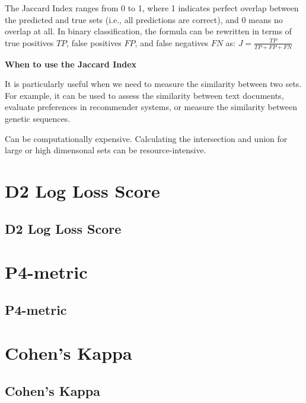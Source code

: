 The Jaccard Index ranges from 0 to 1, where 1 indicates perfect overlap between the predicted and true sets (i.e., all predictions are correct),
and 0 means no overlap at all. In binary classification, the formula can be rewritten in terms of true positives $TP$, false positives $FP$, and false negatives
$FN$ as: $J = \frac{TP}{TP + FP + FN}$

\textbf{When to use the Jaccard Index}

It is particularly useful when we need to measure the similarity between two sets. For example, it can be used to assess the similarity between text documents,
evaluate preferences in recommender systems, or measure the similarity between genetic sequences.

{
    \item Can be computationally expensive. Calculating the intersection and union for large or high dimensonal sets can be resource-intensive.
}


\clearpage
\thispagestyle{classificationstyle}
\section{D2 Log Loss Score}
\subsection{D2 Log Loss Score}

\clearpage
\thispagestyle{classificationstyle}
\section{P4-metric}
\subsection{P4-metric}

\clearpage
\thispagestyle{classificationstyle}
\section{Cohen's Kappa}
\subsection{Cohen's Kappa}

